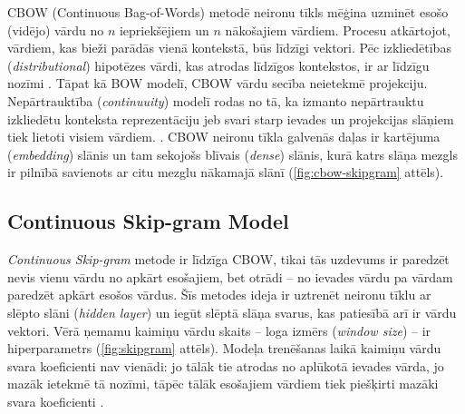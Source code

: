 CBOW (Continuous Bag-of-Words) metodē neironu tīkls mēģina uzminēt esošo (vidējo) vārdu no $n$ iepriekšējiem un $n$ nākošajiem vārdiem. Procesu atkārtojot, vārdiem, kas bieži parādās vienā kontekstā, būs līdzīgi vektori. Pēc izkliedētības (\textit{distributional}) hipotēzes vārdi, kas atrodas līdzīgos kontekstos, ir ar līdzīgu nozīmi \cite{word2vec2013}. Tāpat kā BOW modelī, CBOW vārdu secība neietekmē projekciju. Nepārtrauktība (\textit{continuuity}) modelī rodas no tā, ka izmanto nepārtrauktu izkliedētu konteksta reprezentāciju
jeb svari starp ievades un projekcijas slāņiem tiek lietoti visiem vārdiem.
\cite{word2vec2013}.
CBOW neironu tīkla galvenās daļas ir kartējuma (\textit{embedding}) slānis un tam sekojošs blīvais (\textit{dense}) slānis, kurā katrs slāņa mezgls ir pilnībā savienots ar citu mezglu nākamajā slānī (\ref{fig:cbow-skipgram} attēls).



\subsection{Continuous Skip-gram Model}


\textit{Continuous Skip-gram} metode ir līdzīga CBOW, tikai tās uzdevums ir paredzēt nevis vienu vārdu no apkārt esošajiem, bet otrādi -- no ievades vārdu pa vārdam paredzēt apkārt esošos vārdus.
Šīs metodes ideja ir uztrenēt neironu tīklu ar slēpto slāni (\textit{hidden layer}) un iegūt slēptā slāņa svarus, kas patiesībā arī ir vārdu vektori. Vērā ņemamu kaimiņu vārdu skaits -- loga izmērs (\textit{window size}) -- ir hiperparametrs (\ref{fig:skipgram} attēls). Modeļa trenēšanas laikā kaimiņu vārdu svara koeficienti nav vienādi: jo tālāk tie atrodas no aplūkotā ievades vārda, jo mazāk ietekmē tā nozīmi, tāpēc tālāk esošajiem vārdiem tiek piešķirti mazāki svara koeficienti \cite{word2vec2013}. 


